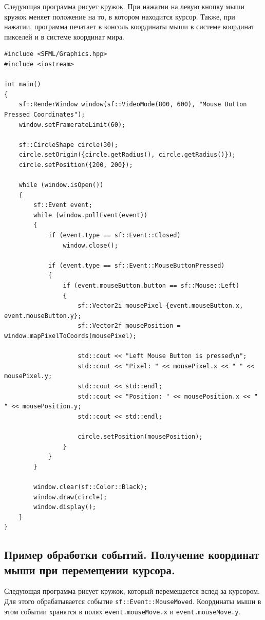 \documentclass{article}
\begin{document}
Следующая программа рисует кружок. При нажатии на левую кнопку мыши кружок меняет положение на то, в котором находится курсор. Также, при нажатии, программа печатает в консоль координаты мыши в системе координат пикселей и в системе координат мира.
\begin{lstlisting}
#include <SFML/Graphics.hpp>
#include <iostream>

int main()
{
    sf::RenderWindow window(sf::VideoMode(800, 600), "Mouse Button Pressed Coordinates");
    window.setFramerateLimit(60);

    sf::CircleShape circle(30);
    circle.setOrigin({circle.getRadius(), circle.getRadius()});
    circle.setPosition({200, 200});

    while (window.isOpen()) 
    {
        sf::Event event;
        while (window.pollEvent(event)) 
        {
            if (event.type == sf::Event::Closed)
                window.close();

            if (event.type == sf::Event::MouseButtonPressed)
            {
                if (event.mouseButton.button == sf::Mouse::Left)
                {
                    sf::Vector2i mousePixel {event.mouseButton.x, event.mouseButton.y};
                    sf::Vector2f mousePosition = window.mapPixelToCoords(mousePixel);

                    std::cout << "Left Mouse Button is pressed\n";
                    std::cout << "Pixel: " << mousePixel.x << " " << mousePixel.y;
                    std::cout << std::endl;
                    std::cout << "Position: " << mousePosition.x << " " << mousePosition.y;
                    std::cout << std::endl;

                    circle.setPosition(mousePosition);
                }
            }
        }

        window.clear(sf::Color::Black);
        window.draw(circle);
        window.display();
    }
}
\end{lstlisting}

\newpage
\subsection*{Пример обработки событий. Получение координат мыши при перемещении курсора.}

Следующая программа рисует кружок, который перемещается вслед за курсором. Для этого обрабатывается событие \texttt{sf::Event::MouseMoved}. Координаты мыши в этом событии хранятся в полях \texttt{event.mouseMove.x} и \texttt{event.mouseMove.у}. 
\end{document}
